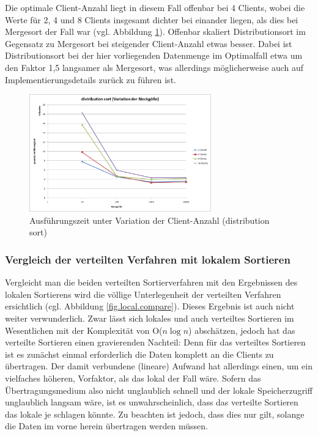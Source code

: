 \documentclass[fontsize=12pt,a4paper,headinclude=no,headings=small]{scrartcl}
\begin{document}
Die optimale Client-Anzahl liegt in diesem Fall offenbar bei 4 Clients, wobei die Werte für 2, 4 und 8 Clients insgesamt dichter bei einander liegen, als dies bei Mergesort der Fall war (vgl. Abbildung \ref{fig.ds.compare.clientcount}). Offenbar skaliert Distributionsort im Gegensatz zu Mergesort bei steigender Client-Anzahl etwas besser. Dabei ist Distributionsort bei der hier vorliegenden Datenmenge im Optimalfall etwa um den Faktor 1,5 langsamer als Mergesort, was allerdings möglicherweise auch auf Implementierungsdetails zurück zu führen ist.

\begin{figure}[H]
	\centering
	\includegraphics[width=0.7\textwidth]{results/sort/diagrams/block_ds.png}
	\caption{Ausführungszeit unter Variation der Client-Anzahl (distribution sort)}
	\label{fig.ds.compare.clientcount}
\end{figure}

\subsubsection{Vergleich der verteilten Verfahren mit lokalem Sortieren}
Vergleicht man die beiden verteilten Sortierverfahren mit den Ergebnissen des lokalen Sortierens wird die völlige Unterlegenheit der verteilten Verfahren ersichtlich (cgl. Abbildung \ref{fig.local.compare}). Dieses Ergebnis ist auch nicht weiter verwunderlich. Zwar lässt sich lokales und auch verteiltes Sortieren im Wesentlichen mit der Komplexität von O($n \log n$) abschätzen, jedoch hat das verteilte Sortieren einen gravierenden Nachteil: Denn für das verteiltes Sortieren ist es zunächst einmal erforderlich die Daten komplett an die Clients zu übertragen. Der damit verbundene (lineare) Aufwand hat allerdings einen, um ein vielfaches höheren, Vorfaktor, als das lokal der Fall wäre. Sofern das Übertragungsmedium also nicht unglaublich schnell und der lokale Speicherzugriff unglaublich langsam wäre, ist es unwahrscheinlich, dass das verteilte Sortieren das lokale je schlagen könnte. Zu beachten ist jedoch, dass dies nur gilt, solange die Daten im vorne herein übertragen werden müssen.
\end{document}
